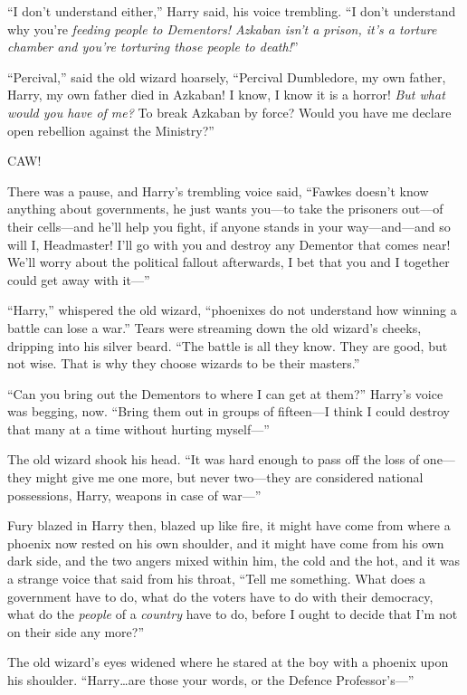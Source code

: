 “I don’t understand either,” Harry said, his voice trembling. “I don’t understand why you’re \emph{feeding people to Dementors! Azkaban isn’t a prison, it’s a torture chamber and you’re torturing those people to \emph{death!}}”

“Percival,” said the old wizard hoarsely, “Percival Dumbledore, my own father, Harry, my own father died in Azkaban! I know, I know it is a horror! \emph{But what would you have of me?} To break Azkaban by force? Would you have me declare open rebellion against the Ministry?”

CAW!

There was a pause, and Harry’s trembling voice said, “Fawkes doesn’t know anything about governments, he just wants you—to take the prisoners out—of their cells—and he’ll help you fight, if anyone stands in your way—and—and so will I, Headmaster! I’ll go with you and destroy any Dementor that comes near! We’ll worry about the political fallout afterwards, I bet that you and I together could get away with it—”

“Harry,” whispered the old wizard, “phoenixes do not understand how winning a battle can lose a war.” Tears were streaming down the old wizard’s cheeks, dripping into his silver beard. “The battle is all they know. They are good, but not wise. That is why they choose wizards to be their masters.”

“Can you bring out the Dementors to where I can get at them?” Harry’s voice was begging, now. “Bring them out in groups of fifteen—I think I could destroy that many at a time without hurting myself—”

The old wizard shook his head. “It was hard enough to pass off the loss of one—they might give me one more, but never two—they are considered national possessions, Harry, weapons in case of war—”

Fury blazed in Harry then, blazed up like fire, it might have come from where a phoenix now rested on his own shoulder, and it might have come from his own dark side, and the two angers mixed within him, the cold and the hot, and it was a strange voice that said from his throat, “Tell me something. What does a government have to do, what do the voters have to do with their democracy, what do the \emph{people} of a \emph{country} have to do, before I ought to decide that I’m not on their side any more?”

The old wizard’s eyes widened where he stared at the boy with a phoenix upon his shoulder. “Harry…are those your words, or the Defence Professor’s—”

